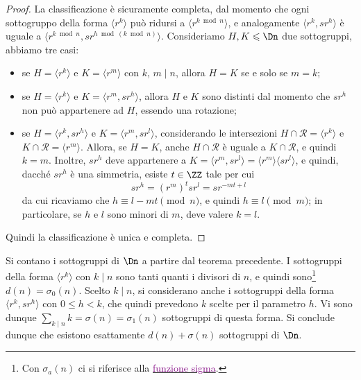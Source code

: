 \documentclass[11pt]{scrartcl}
\begin{document}
	\begin{proof}
		La classificazione è sicuramente completa, dal momento che
		ogni sottogruppo della forma $\langle r^k \rangle$ può ridursi
		a $\langle r^{k \bmod n} \rangle$, e analogamente
		$\langle r^k, sr^h \rangle$ è uguale a
		$\langle r^{k \bmod n}, s r^{h \bmod (k \bmod n)} \rangle$.
		Consideriamo $H, K\leqslant \Dn$ due sottogruppi, abbiamo tre casi:
		\begin{itemize}
			\item se $H = \langle r^k\rangle$ e $K = \langle r^m\rangle$ con $k$, $m \mid n$,
			allora $H = K$ se e solo se $m = k$;
			\item se $H = \langle r^k\rangle$ e $K = \langle r^m, sr^h\rangle$, allora
			$H$ e $K$ sono distinti dal momento che $sr^h$ non può appartenere ad $H$,
			essendo una rotazione;
			\item se $H = \langle r^k, sr^h\rangle$ e $K = \langle r^m, sr^l\rangle$, 
			considerando le intersezioni
			$H \cap \mathcal{R} = \langle r^k\rangle$ e $K \cap \mathcal{R} = \langle r^m\rangle$. Allora, se $H = K$, anche $H \cap \mathcal{R}$ è uguale a
			$K \cap \mathcal{R}$, e quindi $k = m$. Inoltre, $sr^h$ deve appartenere
			a $K = \langle r^m, sr^l \rangle = \langle r^m \rangle \langle sr^l \rangle$,
			e quindi, dacché $sr^h$ è una simmetria, esiste $t \in \ZZ$ tale per cui \[
			sr^h = (r^m)^t sr^l = s r^{-mt + l}
			\]da cui ricaviamo che $h \equiv l - mt \pmod{n}$, e quindi
			$h \equiv l \pmod{m}$; in particolare, se $h$ e $l$ sono minori di $m$,
			deve valere $k = l$.
		\end{itemize}
		
		Quindi la classificazione è unica e completa.
	\end{proof}
	
	\begin{remark}
		Si contano i sottogruppi di $\Dn$ a partire dal teorema precedente.
		I sottogruppi della forma $\langle r^k \rangle$
		con $k \mid n$ sono tanti quanti i divisori di $n$, e quindi sono\footnote{
			Con $\sigma_a(n)$ ci si riferisce alla \href{https://it.wikipedia.org/wiki/Funzione_sigma}{\textcolor{purple}{funzione sigma}}.
		} $d(n) = \sigma_0(n)$.
		Scelto $k \mid n$, si considerano anche i sottogruppi della forma
		$\langle r^k, sr^h \rangle$ con $0 \leq h < k$, che quindi prevedono
		$k$ scelte per il parametro $h$. Vi sono dunque $\sum_{k \mid n} k = \sigma(n)  = \sigma_1(n)$
		sottogruppi di questa forma. Si conclude dunque che esistono esattamente
		$d(n) + \sigma(n)$ sottogruppi di $\Dn$.
	\end{remark}
	
\end{document}
